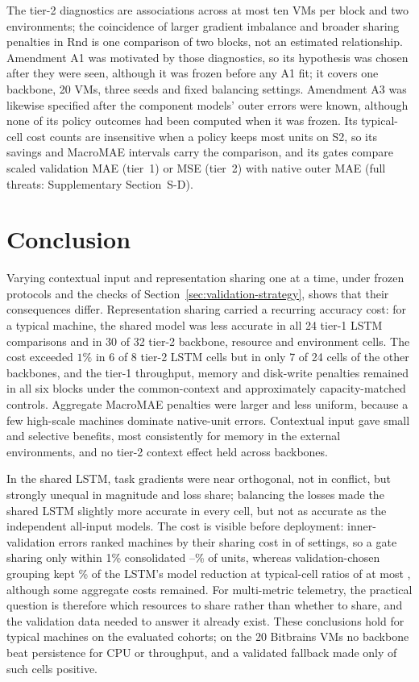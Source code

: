 \documentclass[5p,twocolumn]{elsarticle}
\begin{document}
The tier-2 diagnostics are associations across at most ten VMs per block
and two environments; the coincidence of larger gradient imbalance and
broader sharing penalties in Rnd is one comparison of two blocks, not an
estimated relationship. Amendment A1 was motivated by those diagnostics, so
its hypothesis was chosen after they were seen, although it was frozen before
any A1 fit; it covers one backbone, 20 VMs, three seeds and fixed balancing
settings. Amendment A3 was likewise specified after the component
models' outer errors were known, although none of its policy outcomes had
been computed when it was frozen. Its typical-cell cost counts are
insensitive when a policy keeps most units on S2, so its savings and MacroMAE
intervals carry the comparison, and its gates compare scaled validation MAE
(tier~1) or MSE (tier~2) with native outer MAE (full threats: Supplementary
Section~S-D).

\section{Conclusion}
\label{sec:conclusion}

Varying contextual input and representation sharing one at a time, under
frozen protocols and the checks of Section~\ref{sec:validation-strategy},
shows that their consequences differ. Representation sharing carried a
recurring accuracy cost: for a typical machine, the shared model was less
accurate in all 24 tier-1 LSTM comparisons and in 30 of 32 tier-2 backbone,
resource and environment cells. The cost exceeded $1\%$ in 6 of 8 tier-2 LSTM
cells but in only 7 of 24 cells of the other backbones, and the tier-1
throughput, memory and disk-write penalties remained in all six blocks under
the common-context and approximately capacity-matched controls. Aggregate
MacroMAE penalties were larger and less uniform, because a few high-scale
machines dominate native-unit errors. Contextual input gave small and
selective benefits, most consistently for memory in the external
environments, and no tier-2 context effect held across backbones.

In the shared LSTM, task gradients were near orthogonal, not in conflict, but
strongly unequal in magnitude and loss share; balancing the losses made the
shared LSTM slightly more accurate in every cell, but not as accurate as the
independent all-input models. The cost is visible before deployment:
inner-validation errors ranked machines by their sharing cost in
\AiiiDetects{} of \AiiiFrames{} settings, so a gate sharing only within 1\%
consolidated \AiiiRetainedOne--\AiiiRetainedTwo\% of units, whereas
validation-chosen grouping kept \AiiiGroupRetained\% of the LSTM's model
reduction at typical-cell ratios of at most \AiiiGroupMaxRatio{}, although
some aggregate costs remained. For multi-metric telemetry, the practical
question is therefore which resources to share rather than whether to share,
and the validation data needed to answer it already exist. These conclusions
hold for typical machines on the evaluated cohorts; on the 20 Bitbrains VMs no
backbone beat persistence for CPU or throughput, and a validated fallback made
only \AiiiFallbackPositive{} of \AiiiFallbackCells{} such cells positive.
\end{document}
